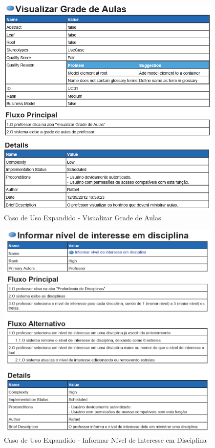 \documentclass{abnt}
\begin{document}
		\begin{figure}[h]
			\begin{center}
				 \includegraphics[width=450px]{casoUsoVisualizarGradeAulas}
				 \caption{Caso de Uso Expandido - Visualizar Grade de Aulas}
			\end{center}
		\end{figure}
		

		\begin{figure}[h]
			\begin{center}
				 \includegraphics[width=450px]{casoUsoInformarNivelInteresseDisciplina}
				 \caption{Caso de Uso Expandido - Informar Nível de Interesse em Disciplina}
			\end{center}
		\end{figure}
		
\end{document}
